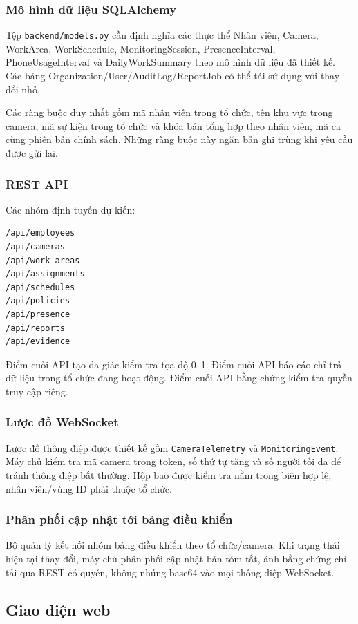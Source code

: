 \subsubsection{Mô hình dữ liệu SQLAlchemy}
Tệp \texttt{backend/models.py} cần định nghĩa các thực thể Nhân viên, Camera, WorkArea, WorkSchedule, MonitoringSession, PresenceInterval, PhoneUsageInterval và DailyWorkSummary theo mô hình dữ liệu đã thiết kế. Các bảng Organization/User/AuditLog/ReportJob có thể tái sử dụng với thay đổi nhỏ.

Các ràng buộc duy nhất gồm mã nhân viên trong tổ chức, tên khu vực trong camera, mã sự kiện trong tổ chức và khóa bản tổng hợp theo nhân viên, mã ca cùng phiên bản chính sách. Những ràng buộc này ngăn bản ghi trùng khi yêu cầu được gửi lại.

\subsubsection{REST API}
Các nhóm định tuyến dự kiến:
\begin{Verbatim}[fontsize=\small,breaklines=true,breakanywhere=true]
/api/employees
/api/cameras
/api/work-areas
/api/assignments
/api/schedules
/api/policies
/api/presence
/api/reports
/api/evidence
\end{Verbatim}
Điểm cuối API tạo đa giác kiểm tra tọa độ 0--1. Điểm cuối API báo cáo chỉ trả dữ liệu trong tổ chức đang hoạt động. Điểm cuối API bằng chứng kiểm tra quyền truy cập riêng.

\subsubsection{Lược đồ WebSocket}
Lược đồ thông điệp được thiết kế gồm \texttt{CameraTelemetry} và \texttt{MonitoringEvent}. Máy chủ kiểm tra mã camera trong token, số thứ tự tăng và số người tối đa để tránh thông điệp bất thường. Hộp bao được kiểm tra nằm trong biên hợp lệ, nhân viên/vùng ID phải thuộc tổ chức.

\subsubsection{Phân phối cập nhật tới bảng điều khiển}
Bộ quản lý kết nối nhóm bảng điều khiển theo tổ chức/camera. Khi trạng thái hiện tại thay đổi, máy chủ phân phối cập nhật bản tóm tắt, ảnh bằng chứng chỉ tải qua REST có quyền, không nhúng base64 vào mọi thông điệp WebSocket.

\subsection{Giao diện web}
